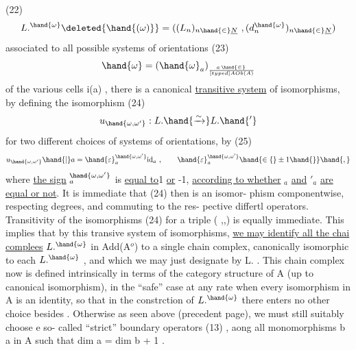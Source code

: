 
(22) \[ L.^{\hand{\omega}}\deleted{\hand{(\omega)}} = ((L_n)_{n\hand{\in}\underline{N}} \ , (d_n^{\hand{\omega}})_{n\hand{\in}\underline{N}} ) \]
associated to  all possible systems of orientations
(23) \[ \hand{\omega} = (\hand{\omega}_a)_{a\, \hand{\in}\, \over[typed]{A}{O}b(A)} \]
of the various cells  i(a)  ,  there is a canonical \uline{transitive system}
of isomorphisms,  by defining the isomorphism
(24) \[ u_{\hand{\omega,\omega'}} : L. \hand{\xrightarrow{\sim}} L.\hand{'} \]
for two different choices  of systems of orientations,  by
(25) \[ u_{\hand{\omega,\omega'}} \hand{\mid} a = \hand{\varepsilon}_a^{\hand{\omega,\omega'}} \mathrm{id}_a \ , \qquad \hand{\varepsilon}_a^{\hand{\omega,\omega'}} \hand{\in\{} \pm 1\hand{\}}\hand{,} \]
where  \uline{the sign}  \hand{$\varepsilon$}$_a^{\hand{\omega,\omega'}}$ is  \uline{equal to}\hand{+}1 \uline{or} -1,  \uline{according to whether}  \hand{$\omega$}$_a$  \uline{and}
\hand{$\omega$}$'_a$  \uline{are equal or not}.  It is immediate that  (24)  then is an isomor-%
phism componentwise,  respecting degrees,  and commuting to the res-%
pective differtl  operators.  Transitivity of the isomorphisms
(24) for a triple  (\hand{$\omega$} ,,)  is equally immediate.  This implies that
by this transive system of isomorphisms,  \uline{we may identify all the chai}
\uline{complees}  $L.^{\hand{\omega}}$  in Add(A$^{o}$) to a single chain complex,  canonically 
isomorphic to each $L.^{\hand{\omega}}$ ,  and which we may just designate by L. .  This
chain complex now is defined intrinsically in terms of the category
structure of A (up to canonical isomorphism),  in the ``safe'' case at
any rate when every isomorphism in A is an identity,  so that in the
constrction of $L.^{\hand{\omega}}$ there enters no other choice besides \hand{$\omega$}.  Otherwise\unsure{,}
as seen above (precedent page),  we must still suitably choose e so-%
called ``strict'' boundary operators  (13) ,  aong all monomorphisms
b \hand{$\hookrightarrow$} a  in A such that  dim a = dim b + 1 .

